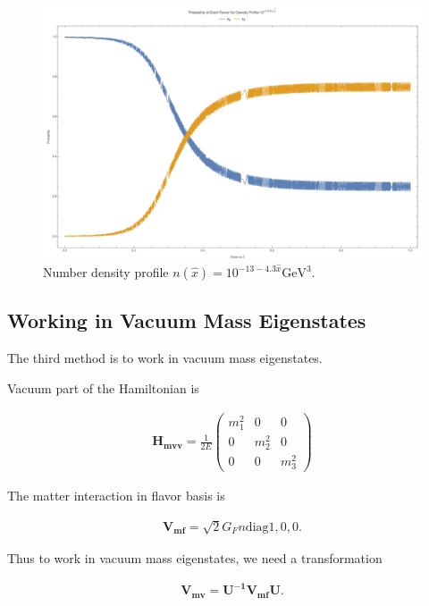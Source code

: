\documentclass{tufte-handout}
\begin{document}
\begin{figure}
\centering
\includegraphics{assets/numericalMSW-model-2flavor-minus13-1}
\caption{Number density profile $n(\hat x) =  10^{-13 - 4.3\hat x}\mathrm{GeV^{3}}$.}
\label{fig:numericalMSW-model-2flavor-minus13-1}
\end{figure}







\subsection{Working in Vacuum Mass Eigenstates}

The third method is to work in vacuum mass eigenstates.

Vacuum part of the Hamiltonian is

\begin{align*}
\mathbf{H_{mvv}} = \frac{1}{2E} \begin{pmatrix}
m_1^2 & 0 & 0 \\
0 & m_2^2 & 0 \\
0 & 0 & m_3^2
\end{pmatrix}
\end{align*}

The matter interaction in flavor basis is

\begin{align*}
\mathbf{V_{mf}} = \sqrt{2}G_F n \mathrm{diag}{1,0,0}.
\end{align*}

Thus to work in vacuum mass eigenstates, we need a transformation

\begin{align*}
\mathbf{V_{mv}} = \mathbf{U^{-1}}\mathbf{V_{mf}} \mathbf{U}.
\end{align*}
\end{document}
